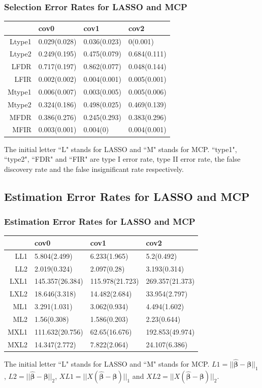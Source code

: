 \documentclass{beamer}
\newcommand{\bm}[1]{{\boldsymbol {#1}}}
\begin{document}
\begin{frame}
\frametitle{Selection Error Rates for LASSO and MCP}
\begin{table}[ht]
\centering
\begin{tabular}{rlll}
  \hline
 & cov0 & cov1 & cov2 \\ 
  \hline
Ltype1 & 0.029(0.028) & 0.036(0.023) & 0(0.001) \\ 
  Ltype2 & 0.249(0.195) & 0.475(0.079) & 0.684(0.111) \\ 
  LFDR & 0.717(0.197) & 0.862(0.077) & 0.048(0.144) \\ 
  LFIR & 0.002(0.002) & 0.004(0.001) & 0.005(0.001) \\ 
  Mtype1 & 0.006(0.007) & 0.003(0.005) & 0.005(0.006) \\ 
  Mtype2 & 0.324(0.186) & 0.498(0.025) & 0.469(0.139) \\ 
  MFDR & 0.386(0.276) & 0.245(0.293) & 0.383(0.296) \\ 
  MFIR & 0.003(0.001) & 0.004(0) & 0.004(0.001) \\ 
   \hline
\end{tabular}
\end{table}
The initial letter ``L" stands for LASSO and ``M" stands for MCP. ``type1", ``type2", ``FDR" and ``FIR" are type I error rate, type II error rate, the false discovery rate and the false insignificant rate respectively.
\end{frame}

\subsection{Estimation Error Rates for LASSO and MCP}
\begin{frame}
\frametitle{Estimation Error Rates for LASSO and MCP}
\begin{table}[ht]
\centering
\begin{tabular}{rlll}
  \hline
 & cov0 & cov1 & cov2 \\ 
  \hline
LL1 & 5.804(2.499) & 6.233(1.965) & 5.2(0.492) \\ 
  LL2 & 2.019(0.324) & 2.097(0.28) & 3.193(0.314) \\ 
  LXL1 & 145.357(26.384) & 115.978(21.723) & 269.357(21.373) \\ 
  LXL2 & 18.646(3.318) & 14.482(2.684) & 33.954(2.797) \\ 
  ML1 & 3.291(1.031) & 3.062(0.934) & 4.494(1.602) \\ 
  ML2 & 1.56(0.308) & 1.586(0.203) & 2.23(0.644) \\ 
  MXL1 & 111.632(20.756) & 62.65(16.676) & 192.853(49.974) \\ 
  MXL2 & 14.347(2.772) & 7.822(2.064) & 24.107(6.386) \\ 
   \hline
\end{tabular}
\end{table}
The initial letter ``L" stands for LASSO and ``M" stands for MCP. $L1=||\hat{\bm\beta}-\bm\beta||_1$, $L2=||\hat{\bm\beta}-\bm\beta||_2$, $XL1=||X(\hat{\bm\beta}-\bm\beta)||_1$ and $XL2=||X(\hat{\bm\beta}-\bm\beta)||_2$.
\end{frame}
\end{document}
